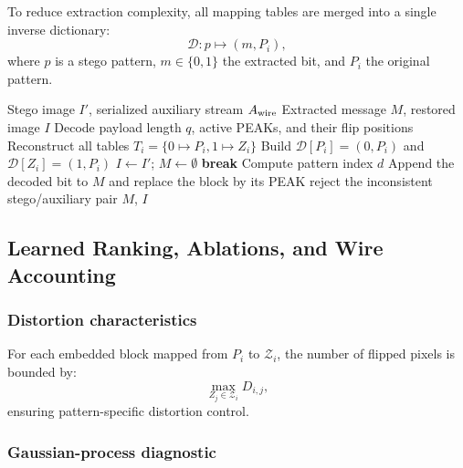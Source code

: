 \documentclass[a4paper,fleqn]{cas-dc}
\begin{document}
To reduce extraction complexity, all mapping tables are merged into a single inverse dictionary:
\begin{equation}
\mathcal{D} : p \mapsto (m, P_i),
\label{eq:inverse-dictionary}
\end{equation}
where $p$ is a stego pattern, $m\in\{0,1\}$ the extracted bit, and $P_i$ the
original pattern.

\begin{algorithm*}[t]
\caption{Deterministic Extraction and Exact Restoration}
\label{alg:extraction}
\begin{algorithmic}[1]
\Require Stego image $I'$, serialized auxiliary stream $A_{\rm wire}$
\Ensure Extracted message $M$, restored image $I$
\State Decode payload length $q$, active PEAKs, and their flip positions
\State Reconstruct all tables $T_i=\{0\mapsto P_i,1\mapsto Z_i\}$
\State Build $\mathcal D[P_i]=(0,P_i)$ and $\mathcal D[Z_i]=(1,P_i)$
\State $I\gets I'$; $M\gets\emptyset$
        \State \textbf{break}
    \EndIf
    \State Compute pattern index $d$
        \State Append the decoded bit to $M$ and replace the block by its PEAK
    \EndIf
\EndFor
{}
    \State reject the inconsistent stego/auxiliary pair
\EndIf
\State \Return $M$, $I$
\end{algorithmic}
\end{algorithm*}

\subsection{Learned Ranking, Ablations, and Wire Accounting}

\subsubsection*{Distortion characteristics}

For each embedded block mapped from $P_i$ to $\mathcal{Z}_i$, the number of flipped pixels is bounded by:
\begin{equation}
\max_{Z_j \in \mathcal{Z}_i} D_{i,j},
\label{eq:distortion-bound}
\end{equation}
ensuring pattern-specific distortion control.

\subsubsection*{Gaussian-process diagnostic}
\label{subsec:param_optim}
\end{document}
